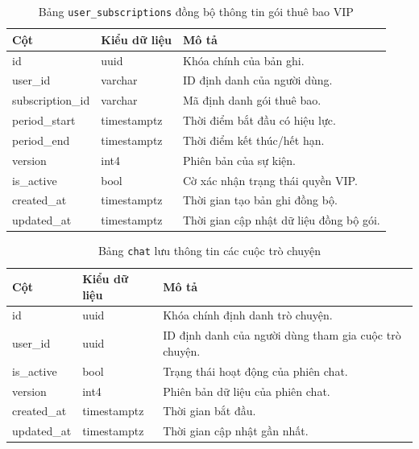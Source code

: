\begin{table}[H]
\centering
\begin{tabular}{|l|l|p{6cm}|}
\hline
\textbf{Cột} & \textbf{Kiểu dữ liệu} & \textbf{Mô tả} \\ \hline
id & uuid & Khóa chính của bản ghi. \\ \hline
user\_id & varchar & ID định danh của người dùng. \\ \hline
subscription\_id & varchar & Mã định danh gói thuê bao. \\ \hline
period\_start & timestamptz & Thời điểm bắt đầu có hiệu lực. \\ \hline
period\_end & timestamptz & Thời điểm kết thúc/hết hạn. \\ \hline
version & int4 & Phiên bản của sự kiện. \\ \hline
is\_active & bool & Cờ xác nhận trạng thái quyền VIP. \\ \hline
created\_at & timestamptz & Thời gian tạo bản ghi đồng bộ. \\ \hline
updated\_at & timestamptz & Thời gian cập nhật dữ liệu đồng bộ gói. \\ \hline
\end{tabular}
\caption{Bảng \texttt{user\_subscriptions} đồng bộ thông tin gói thuê bao VIP}
\end{table}

\begin{table}[H]
\centering
\begin{tabular}{|l|l|p{6cm}|}
\hline
\textbf{Cột} & \textbf{Kiểu dữ liệu} & \textbf{Mô tả} \\ \hline
id & uuid & Khóa chính định danh trò chuyện. \\ \hline
user\_id & uuid & ID định danh của người dùng tham gia cuộc trò chuyện. \\ \hline
is\_active & bool & Trạng thái hoạt động của phiên chat. \\ \hline
version & int4 & Phiên bản dữ liệu của phiên chat. \\ \hline
created\_at & timestamptz & Thời gian bắt đầu. \\ \hline
updated\_at & timestamptz & Thời gian cập nhật gần nhất. \\ \hline
\end{tabular}
\caption{Bảng \texttt{chat} lưu thông tin các cuộc trò chuyện}
\end{table}

